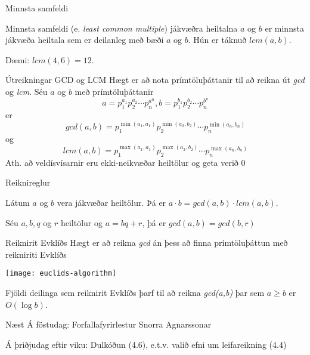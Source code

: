 \documentclass[handout]{beamer}
\begin{document}
\begin{frame}{Minnsta samfeldi}
\begin{tcolorbox}[title=Minnsta samfeldi]
Minnsta samfeldi (e. \emph{least common multiple}) jákvæðra heiltalna $a$ og $b$ er minnsta jákvæða heiltala sem er deilanleg með bæði $a$ og $b$. Hún er táknuð $lcm(a, b)$.
\end{tcolorbox}
Dæmi: $lcm(4, 6) = 12$.
\end{frame}

\begin{frame}{Útreikningar GCD og LCM}
    Hægt er að nota prímtöluþáttanir til að reikna út \emph{gcd} og \emph{lcm}. Séu $a$ og $b$ með prímtöluþáttanir
    \[
        a = p_1^{a_1}p_2^{a_2}\cdots p_n^{a^n},b = p_1^{b_1}p_2^{b_2}\cdots p_n^{b^n}
    \]
    er
    \[
        gcd(a,b) = p_1^{\min(a_1,a_1)}p_2^{\min(a_2,b_2)} \cdots p_n^{\min(a_n,b_n)}
    \]
    og
    \[
        lcm(a,b) = p_1^{\max(a_1,a_1)}p_2^{\max(a_2,b_2)} \cdots p_n^{\max(a_n,b_n)}
    \]
    Ath. að veldísvísarnir eru ekki-neikvæðar heiltölur og geta verið 0
\end{frame}

\begin{frame}{Reiknireglur}
    \begin{tcolorbox}[title=GCD og LCM]
        Látum $a$ og $b$ vera jákvæðar heiltölur. Þá er $a\cdot b = gcd(a, b) \cdot lcm(a, b)$.
    \end{tcolorbox}

    \begin{tcolorbox}[title=GCD og deilingarafgangur]
        Séu $a,b,q$ og $r$ heiltölur og $a = bq + r$, þá er $gcd(a,b) = gcd(b,r)$
    \end{tcolorbox}
\end{frame}

\begin{frame}{Reiknirit Evklíðs}
    Hægt er að reikna \emph{gcd} án þess að finna prímtöluþáttun með reikniriti Evklíðs

    \begin{center}
        \texttt{[image: euclids-algorithm]}
    \end{center}

    Fjöldi deilinga sem reiknirit Evklíðs þarf til að reikna \emph{gcd(a,b)} þar sem $a \geq b$ er $O(\log b)$.
\end{frame}

\begin{frame}{Næst}
    Á föstudag: Forfallafyrirlestur Snorra Agnarssonar

    Á þriðjudag eftir viku: Dulkóðun (4.6), e.t.v. valið efni um leifareikning (4.4)
\end{frame}
\end{document}
